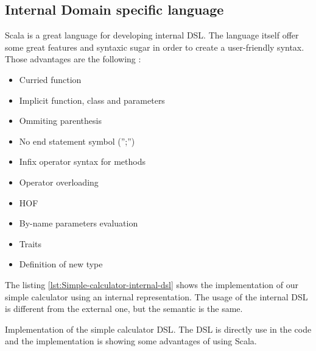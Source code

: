 \subsection{Internal Domain specific language}
\label{subsec:scala_internal_dsl}

Scala is a great language for developing internal \gls{DSL}. The language itself
offer some great features and syntaxic sugar in order to create a user-friendly
syntax. Those advantages are the following \cite{filipkrikava2013}:

\begin{itemize}
\item Curried function
\item Implicit function, class and parameters
\item Ommiting parenthesis
\item No end statement symbol ('';'')
\item Infix operator syntax for methods
\item Operator overloading
\item \gls{HOF}
\item By-name parameters evaluation
\item Traits
\item Definition of new type
\end{itemize}

The listing \ref{lst:Simple-calculator-internal-dsl} shows the implementation of
our simple calculator using an internal representation. The usage of the
internal \gls{DSL} is different from the external one, but the semantic is the
same.

\begin{listing}[ht]
\centering
{}
\caption[Implementation of the simple calculator \gls{DSL}]{Implementation of
the simple calculator \gls{DSL}. The DSL is directly use in the code and
the implementation is showing some advantages of using Scala.}
\label{lst:Simple-calculator-internal-dsl}
\end{listing}

